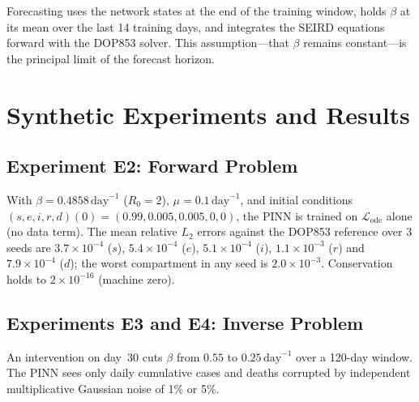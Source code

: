 \documentclass[11pt,a4paper]{article}
\theoremstyle{remark}
\begin{document}
Forecasting uses the network states at the end of the training window, holds
$\beta$ at its mean over the last 14 training days, and integrates the SEIRD
equations forward with the DOP853 solver.  This assumption---that $\beta$
remains constant---is the principal limit of the forecast horizon.

\section{Synthetic Experiments and Results}
\label{sec:results}

\subsection{Experiment E2: Forward Problem}

With $\beta = 0.4858\,\text{day}^{-1}$ ($R_0=2$), $\mu=0.1\,\text{day}^{-1}$,
and initial conditions $(s,e,i,r,d)(0) = (0.99,0.005,0.005,0,0)$, the PINN
is trained on $\mathcal{L}_{\text{ode}}$ alone (no data term).  The mean
relative $L_2$ errors against the DOP853 reference over 3 seeds are
$3.7\times10^{-4}$ ($s$), $5.4\times10^{-4}$ ($e$), $5.1\times10^{-4}$
($i$), $1.1\times10^{-3}$ ($r$) and $7.9\times10^{-4}$ ($d$); the worst
compartment in any seed is $2.0\times10^{-3}$.  Conservation holds to
$2\times10^{-16}$ (machine zero).

\subsection{Experiments E3 and E4: Inverse Problem}

An intervention on day~30 cuts $\beta$ from $0.55$ to $0.25\,\text{day}^{-1}$
over a 120-day window.  The PINN sees only daily cumulative cases and deaths
corrupted by independent multiplicative Gaussian noise of 1\% or 5\%.
\end{document}
